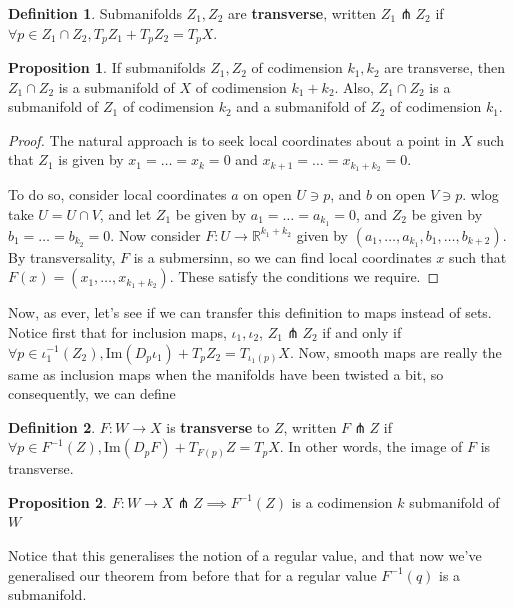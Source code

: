 \documentclass{article}
\theoremstyle{definition}
\newtheorem{definition}{Definition}
\newtheorem{proposition}{Proposition}
\begin{document}
\begin{definition}
  Submanifolds $Z_1, Z_2$ are \textbf{transverse}, written $Z_1 \pitchfork Z_2$ if
  $\forall p \in Z_1 \cap Z_2, T_pZ_1 + T_pZ_2 = T_pX$.
\end{definition}

\begin{proposition}
  If submanifolds $Z_1, Z_2$ of codimension $k_1, k_2$ are transverse, then $Z_1
  \cap Z_2$ is a submanifold of $X$ of codimension $k_1 + k_2$. Also, $Z_1 \cap
  Z_2$ is a submanifold of $Z_1$ of codimension $k_2$ and a submanifold of $Z_2$
  of codimension $k_1$.
\end{proposition}

\begin{proof}
The natural approach is to seek local coordinates about a point in $X$ such that
$Z_1$ is given by $x_1 = \dots = x_k = 0$ and $x_{k + 1} = \dots = x_{k_1 + k_2}
= 0$.

To do so, consider local coordinates $a$ on open $U \ni p$, and $b$ on open $V
\ni p$. wlog take $U = U \cap V$, and let $Z_1$ be given by $a_1 = \dots =
a_{k_1} = 0$, and $Z_2$ be given by $b_1 = \dots = b_{k_2} = 0$. Now consider $F
: U \to \mathbb{R}^{k_1 + k_2}$ given by $(a_1, \dots, a_{k_1}, b_1, \dots, b_{k
+ 2})$. By transversality, $F$ is a submersinn, so we can find local coordinates
$x$ such that $F(x) = (x_1, \dots, x_{k_1 + k_2})$. These satisfy the conditions
we require.
\end{proof}

Now, as ever, let's see if we can transfer this definition to maps instead of
sets. Notice first that for inclusion maps, $\iota_1, \iota_2$, $Z_1 \pitchfork
Z_2$ if and only if $\forall p \in \iota_1^{-1}(Z_2), \text{Im}(D_p \iota_1) +
T_pZ_2 = T_{\iota_1(p)}X$. Now, smooth maps are really the same as
inclusion maps when the manifolds have been twisted a bit, so consequently, we
can define

\begin{definition}
$F: W \to X$ is \textbf{transverse} to $Z$, written $F \pitchfork Z$ if $\forall
p \in F^{-1}(Z), \text{Im}(D_pF) + T_{F(p)}Z = T_p X$. In other words, the image
of $F$ is transverse.
\end{definition}

\begin{proposition}
$F: W \to X \pitchfork Z \implies F^{-1}(Z)$ is a codimension $k$ submanifold of
$W$
\end{proposition}

Notice that this generalises the notion of a regular value, and that now we've
generalised our theorem from before that for a regular value $F^{-1}(q)$ is a
submanifold. 
\end{document}
